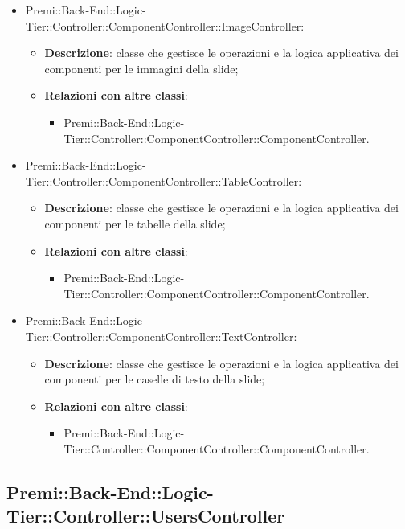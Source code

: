 \begin{itemize}
		\item Premi::Back-End::Logic-Tier::Controller::ComponentController::ImageController:
		\begin{itemize}
			\item \textbf{Descrizione}: classe che gestisce le operazioni e la logica applicativa dei componenti per le immagini della \gls{slide};
			\item \textbf{Relazioni con altre classi}:
			\begin{itemize}
				\item Premi::Back-End::Logic-Tier::Controller::ComponentController::ComponentController.
			\end{itemize}
		\end{itemize}
		
		\item Premi::Back-End::Logic-Tier::Controller::ComponentController::TableController:
		\begin{itemize}
			\item \textbf{Descrizione}: classe che gestisce le operazioni e la logica applicativa dei componenti per le tabelle della \gls{slide};
			\item \textbf{Relazioni con altre classi}:
			\begin{itemize}
				\item Premi::Back-End::Logic-Tier::Controller::ComponentController::ComponentController.
			\end{itemize}
		\end{itemize}
		
		\item Premi::Back-End::Logic-Tier::Controller::ComponentController::TextController:
		\begin{itemize}
			\item \textbf{Descrizione}: classe che gestisce le operazioni e la logica applicativa dei componenti per le caselle di testo della \gls{slide};
			\item \textbf{Relazioni con altre classi}:
			\begin{itemize}
				\item Premi::Back-End::Logic-Tier::Controller::ComponentController::ComponentController.
			\end{itemize}
		\end{itemize}
	\end{itemize}
	
\newpage
	
\subsection{Premi::Back-End::Logic-Tier::Controller::UsersController}
